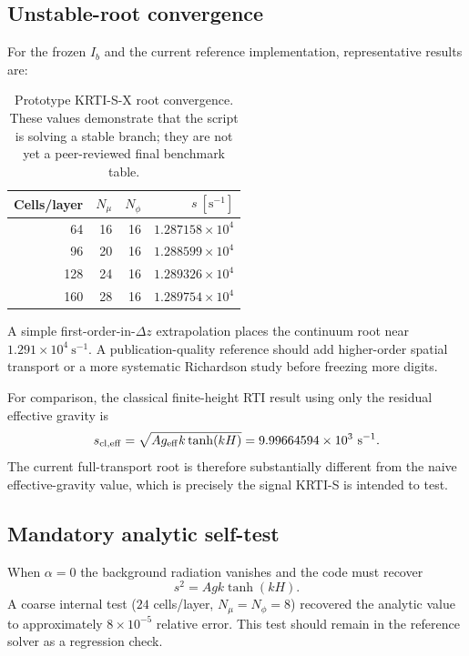 \documentclass[11pt]{article}
\begin{document}
\subsection{Unstable-root convergence}
For the frozen $I_b$ and the current reference implementation, representative results are:
\begin{table}[H]
\centering
\caption{Prototype KRTI-S-X root convergence. These values demonstrate that the script is solving a stable branch; they are not yet a peer-reviewed final benchmark table.}
\begin{tabular}{rrrr}
\toprule
Cells/layer & $N_\mu$ & $N_\phi$ & $s\ [\mathrm{s^{-1}}]$ \\
\midrule
64 & 16 & 16 & $1.287158\times10^4$ \\
96 & 20 & 16 & $1.288599\times10^4$ \\
128 & 24 & 16 & $1.289326\times10^4$ \\
160 & 28 & 16 & $1.289754\times10^4$ \\
\bottomrule
\end{tabular}
\end{table}
A simple first-order-in-$\Delta z$ extrapolation places the continuum root near $1.291\times10^4\ \mathrm{s^{-1}}$. A publication-quality reference should add higher-order spatial transport or a more systematic Richardson study before freezing more digits.

For comparison, the classical finite-height RTI result using only the residual effective gravity is
\begin{equation}
s_{\rm cl,eff}=\sqrt{A g_{\rm eff} k\tanh(kH)}=9.99664594\times10^3\ \mathrm{s^{-1}}.
\end{equation}
The current full-transport root is therefore substantially different from the naive effective-gravity value, which is precisely the signal KRTI-S is intended to test.

\subsection{Mandatory analytic self-test}
When $\alpha=0$ the background radiation vanishes and the code must recover
\begin{equation}
s^2=A g k\tanh(kH).
\end{equation}
A coarse internal test ($24$ cells/layer, $N_\mu=N_\phi=8$) recovered the analytic value to approximately $8\times10^{-5}$ relative error. This test should remain in the reference solver as a regression check.
\end{document}
